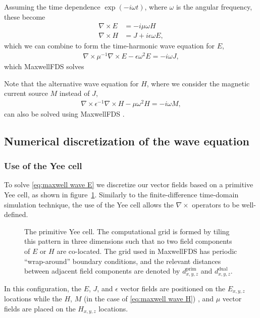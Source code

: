\documentclass{article}
\newcommand{\E}[2]{\begin{align}#2\label{eq:#1}\end{align}}
\newcommand{\EE}[2]{\begin{subequations}\begin{align}#2\end{align}\label{eq:#1}\end{subequations}}
\newcommand{\curl}{\nabla\times}
\newcommand{\eq}[1]{\eqref{eq:#1}}
\newcommand{\fig}[1]{figure~\ref{fig:#1}}
\newcommand{\MaxwellFDS}{MaxwellFDS }
\newcommand{\prim}{\text{prim}}
\newcommand{\dual}{\text{dual}}
\begin{document}
Assuming the time dependence $\exp(-i \omega t)$, 
    where $\omega$ is the angular frequency,
    these become
\EE {maxwell harmonic}
    {\curl E &= - i \mu \omega H \\
    \curl H &= J + i \epsilon \omega E,}
    which we can combine to form the time-harmonic wave equation for $E$,
    \E{maxwell wave E}
    {\curl \mu^{-1} \curl E - \epsilon \omega^2 E = -i \omega J,}
    which \MaxwellFDS solves

Note that the alternative wave equation for $H$,
    where we consider the magnetic current source $M$
    instead of $J$,
\E  {maxwell wave H}
    {\curl \epsilon^{-1} \curl H - \mu \omega^2 H = -i \omega M,}
    can also be solved using \MaxwellFDS.

\subsection{Numerical discretization of the wave equation}
\subsubsection{Use of the Yee cell}
To solve \eq{maxwell wave E} we discretize our vector fields 
    based on a primitive Yee cell, as shown in \fig{yee cell}. %
Similarly to the finite-difference time-domain simulation technique,
    the use of the Yee cell allows the $\curl$ operators to be well-defined.

\begin{figure}[ht]\begin{center}
    
    \end{center}
    \caption{   The primitive Yee cell. 
                The computational grid is formed by tiling this pattern
                    in three dimensions such that no two field components
                    of $E$ or $H$ are co-located. %
                The grid used in \MaxwellFDS has periodic ``wrap-around''
                    boundary conditions, and 
                    the relevant distances between adjacent field components
                    are denoted by $d^\prim_{x,y,z}$ and 
                    $d^\dual_{x,y,z}$.}
    \label{fig:yee cell}
\end{figure}

In this configuration, the $E$, $J$, and $\epsilon$ vector fields
    are positioned on the $E_{x,y,z}$ locations 
    while the $H$, $M$ (in the case of \eq{maxwell wave H}) , and $\mu$
    vector fields are placed on the $H_{x,y,z}$ locations.
\end{document}
